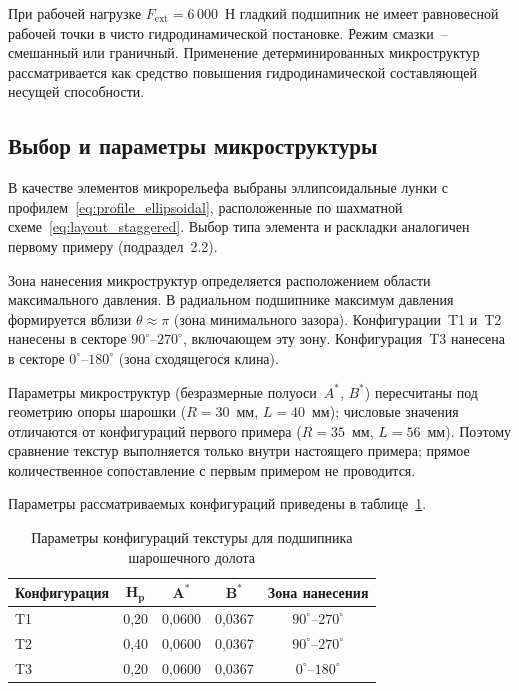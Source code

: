 При рабочей нагрузке $F_{\mathrm{ext}} = 6\,000$~Н гладкий
подшипник не имеет равновесной рабочей точки в чисто
гидродинамической постановке. Режим смазки~-- смешанный или
граничный. Применение детерминированных микроструктур
рассматривается как средство повышения гидродинамической
составляющей несущей способности.


\subsection{Выбор и параметры микроструктуры}

В качестве элементов микрорельефа выбраны эллипсоидальные лунки
с профилем~\eqref{eq:profile_ellipsoidal}, расположенные
по шахматной схеме~\eqref{eq:layout_staggered}. Выбор типа
элемента и раскладки аналогичен первому примеру (подраздел~2.2).

Зона нанесения микроструктур определяется расположением области
максимального давления. В радиальном подшипнике максимум давления
формируется вблизи $\theta \approx \pi$ (зона минимального зазора).
Конфигурации~T1 и~T2 нанесены в секторе
$90^{\circ}$--$270^{\circ}$, включающем эту зону. Конфигурация~T3
нанесена в секторе $0^{\circ}$--$180^{\circ}$ (зона сходящегося
клина).

Параметры микроструктур (безразмерные полуоси~$A^*$, $B^*$)
пересчитаны под геометрию опоры шарошки ($R = 30$~мм,
$L = 40$~мм); числовые значения отличаются от конфигураций
первого примера ($R = 35$~мм, $L = 56$~мм). Поэтому сравнение текстур
выполняется только внутри настоящего примера; прямое количественное
сопоставление с первым примером не проводится.

Параметры рассматриваемых конфигураций приведены в
таблице~\ref{tab:bit_texture_configs}.

\begin{table}[!ht]
\centering
\caption{Параметры конфигураций текстуры для подшипника шарошечного долота}
\label{tab:bit_texture_configs}
\begin{tabularx}{\textwidth}{|X|c|c|c|c|}
\hline
\multicolumn{1}{|c|}{\textbf{Конфигурация}} & $\boldsymbol{H_p}$ & $\boldsymbol{A^*}$ & $\boldsymbol{B^*}$ & \textbf{Зона нанесения} \\
\hline
T1 & 0{,}20 & 0{,}0600 & 0{,}0367 & $90^{\circ}$--$270^{\circ}$ \\
\hline
T2 & 0{,}40 & 0{,}0600 & 0{,}0367 & $90^{\circ}$--$270^{\circ}$ \\
\hline
T3 & 0{,}20 & 0{,}0600 & 0{,}0367 & $0^{\circ}$--$180^{\circ}$ \\
\hline
\end{tabularx}
\end{table}


